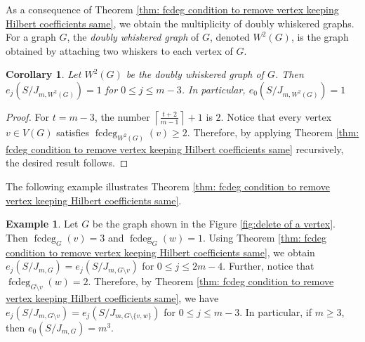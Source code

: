 \documentclass[12pt,reqno]{amsart}
\DeclareMathOperator{\fcdeg}{fcdeg}
\theoremstyle{plain}
\newtheorem{corollary}[theorem]{Corollary}
\theoremstyle{definition}
\newtheorem{example}[theorem]{Example}
\begin{document}
As a consequence of Theorem \ref{thm: fcdeg condition to remove vertex keeping Hilbert coefficients same}, we obtain the multiplicity of doubly whiskered graphs. For a graph \(G\), the \emph{doubly whiskered graph} of \(G\), denoted \(W^2(G)\), is the graph obtained by attaching two whiskers to each vertex of \(G\).

\begin{corollary}
    Let $W^2(G)$ be the doubly whiskered graph of $G$. Then $e_j(S/J_{m,W^2(G)})=1$ for $0\leq j\leq m-3$. In particular, $e_0(S/J_{m,W^2(G)})=1$
\end{corollary}
\begin{proof}
    For $t=m-3$, the number $\left\lceil\frac{t+2}{m-1}\right\rceil+1$ is $2$. Notice that every vertex $v\in V(G)$ satisfies $\fcdeg_{W^2(G)}(v)\geq 2$. Therefore, by applying Theorem \ref{thm: fcdeg condition to remove vertex keeping Hilbert coefficients same} recursively, the desired result follows.
\end{proof}
The following example illustrates Theorem \ref{thm: fcdeg condition to remove vertex keeping Hilbert coefficients same}.
\begin{example}
    Let $G$ be the graph shown in the Figure \ref{fig:delete of a vertex}. Then $\fcdeg_G(v)=3$ and $\fcdeg_G(w)=1$. Using Theorem \ref{thm: fcdeg condition to remove vertex keeping Hilbert coefficients same}, we obtain $e_j(S/J_{m,G})=e_j(S/J_{m,G\setminus v})$ for $0\leq j\leq 2m-4$. Further, notice that $\fcdeg_{G\setminus v}(w)=2$. Therefore, by Theorem \ref{thm: fcdeg condition to remove vertex keeping Hilbert coefficients same}, we have $e_j(S/J_{m,G\setminus v})=e_j(S/J_{m,G\setminus\{v,w\}})$ for $0\leq j\leq m-3$. In particular, if $m\geq 3$, then $e_0(S/J_{m,G})=m^3$. 
\end{example}
\end{document}
